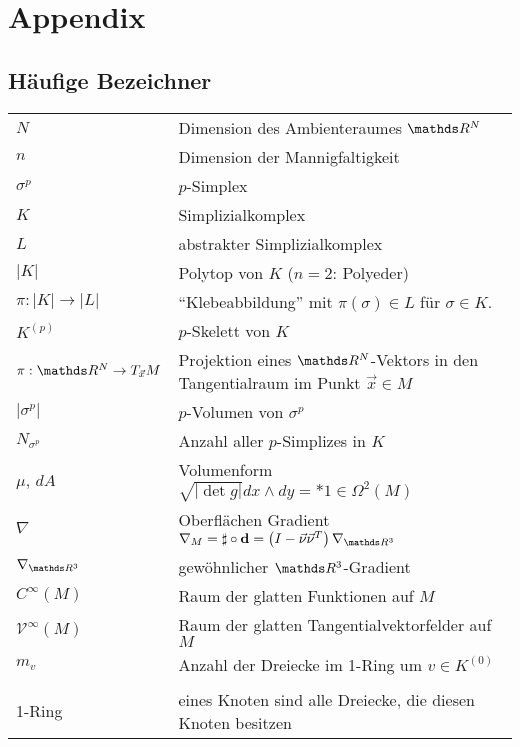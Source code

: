 \newcommand{\trace}{\text{Trace}}


\chapter{Appendix}

\section{Häufige Bezeichner}

\begin{tabular}{p{}p{}}
  \( N \) & Dimension des Ambienteraumes \( \R^{N} \) \\
  \( n \) & Dimension der Mannigfaltigkeit \\
  \( \sigma^{p} \) & \( p \)-Simplex \\
  \( K \) & Simplizialkomplex \\
  \( L \) & abstrakter Simplizialkomplex\\
  \( |K| \) & Polytop von \( K \) (\( n=2 \): Polyeder)\\
  \( \pi: |K| \rightarrow |L| \) & "`Klebeabbildung"'  mit \( \pi(\sigma)\in L \) für \( \sigma\in K \). \\
  \( K^{(p)} \) & \( p \)-Skelett von \( K \)\\
  \( \pi: \R^{N}\rightarrow T_{\vec{x}}M \) & Projektion eines \( \R^{N} \)-Vektors in den Tangentialraum im Punkt \( \vec{x}\in M \) \\
  \( \left| \sigma^{p} \right| \) & \( p \)-Volumen von \( \sigma^{p} \)\\
  \( N_{\sigma^{p}} \) & Anzahl aller \( p \)-Simplizes in \( K \)\\
  \( \mu \), \( dA \) & Volumenform \( \sqrt{|\det g|} dx\wedge dy = *1 \in \Omega^{2}(M) \) \\
  \( \nabla \) & Oberflächen Gradient \( \nabla_{M} = \sharp\circ\exd 
                                                    = \left( I - \vec{\nu}\vec{\nu}^{T}
                                                    \right)\nabla_{\R^{3}} \) \\
  \( \nabla_{\R^{3}} \) & gewöhnlicher \( \R^{3} \)-Gradient \\
  \( C^{\infty}(M) \) & Raum der glatten Funktionen auf \( M \) \\
  \( \mathcal{V}^{\infty}(M) \) & Raum der glatten Tangentialvektorfelder auf \( M \) \\
  \( m_{v} \) & Anzahl der Dreiecke im 1-Ring um \( v\in K^{(0)}\)\\
  &\\
  1-Ring & eines Knoten sind alle Dreiecke, die diesen Knoten besitzen \\
\end{tabular}


